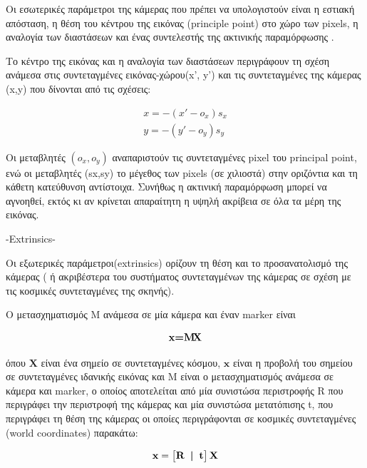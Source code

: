 Οι εσωτερικές παράμετροι της κάμερας που πρέπει να υπολογιστούν είναι η εστιακή απόσταση, η θέση του κέντρου της εικόνας (principle point) στο χώρο των pixels, η αναλογία των διαστάσεων και ένας συντελεστής της ακτινικής παραμόρφωσης \cite{Malik2002}. 



Το κέντρο της εικόνας και η αναλογία των διαστάσεων περιγράφουν τη σχέση ανάμεσα στις συντεταγμένες εικόνας-χώρου(x', y') και τις συντεταγμένες της κάμερας (x,y) που δίνονται από τις σχέσεις:

\begin{equation}
\begin{aligned}
x=-(x'-o_{x})s_{x}
\\
y=-(y'-o_{y})s_{y}
\end{aligned}
\end{equation}

Οι μεταβλητές $(o_{x},o_{y})$ αναπαριστούν τις συντεταγμένες pixel του principal point, ενώ οι μεταβλητές (sx,sy) το μέγεθος των pixels (σε χιλιοστά) στην οριζόντια και τη κάθετη κατεύθυνση αντίστοιχα.
Συνήθως η ακτινική παραμόρφωση μπορεί να αγνοηθεί, εκτός κι αν κρίνεται απαραίτητη η υψηλή ακρίβεια σε όλα τα μέρη της εικόνας. 


-Extrinsics-

Οι εξωτερικές παράμετροι(extrinsics) ορίζουν τη θέση και το προσανατολισμό της κάμερας ( ή ακριβέστερα του συστήματος συντεταγμένων της κάμερας σε σχέση με τις κοσμικές συντεταγμένες της σκηνής). 


Ο μετασχηματισμός M ανάμεσα σε μία κάμερα και έναν marker είναι

\begin{equation}
\textbf{x=M\!X}
\end{equation}


όπου $\textbf{Χ}$ είναι ένα σημείο σε συντεταγμένες κόσμου, $\textbf{x}$ είναι η προβολή του σημείου σε συντεταγμένες ιδανικής εικόνας και M είναι ο μετασχηματισμός ανάμεσα σε κάμερα και marker, ο οποίος αποτελείται από μία συνιστώσα περιστροφής R που περιγράφει την περιστροφή της κάμερας και μία συνιστώσα μετατόπισης t, που περιγράφει τη θέση της κάμερας οι οποίες περιγράφονται σε κοσμικές συντεταγμένες (world coordinates) παρακάτω:




\begin{equation}
\textbf{x}=
\begin{bmatrix}
\textbf{R \! | \! t}
\end{bmatrix}
\textbf{X}
\end{equation}


